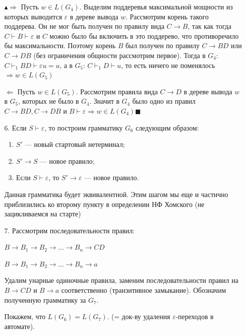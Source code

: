 \begin{itemize}
$\blacktriangle\Rightarrow$ Пусть $w \in L(G_4)$. Выделим поддеревья максимальной мощности из которых выводится $\varepsilon$ в дереве вывода $w$. Рассмотрим корень такого поддерева. Он не мог быть получен по правилу вида $C \rightarrow B$, так как тогда $C \vdash B \vdash \varepsilon$ и $C$ можно было бы включить в это поддерево, что противоречило бы максимальности. Поэтому корень $B$ был получен по правилу $C \rightarrow BD$ или $C \rightarrow DB$ (без ограничения общности рассмотрим первое). Тогда в $G_4$: $C \vdash_1 BD \vdash \varepsilon u = u$, а в $G_5$: $C \vdash_1 D \vdash u$, то есть ничего не поменялось $\Rightarrow w \in L(G_5)$

$\Leftarrow$ Пусть $w \in L(G_5)$. Рассмотрим правила вида $C \rightarrow D$ в дереве вывода $w$ в $G_5$, которых не было в $G_4$. Значит в $G_4$ было одно из правил $C \rightarrow BD, C\rightarrow DB$ и $B \vdash \varepsilon \Rightarrow w \in L(G_4) \blacksquare$

    \item[6.]Если $S \vdash \varepsilon$, то построим грамматику $G_6$ следующим образом:
\begin{enumerate}
    \item $S'$ — новый стартовый нетерминал;
    \item $S' \rightarrow S$ — новое правило;
    \item Если $S \vdash \varepsilon$, то $S' \rightarrow \varepsilon$ — новое правило.
\end{enumerate}

Данная грамматика будет эквивалентной. Этим шагом мы еще и частично приблизились ко второму пункту в определении НФ Хомского (не зацикливаемся на старте)

\item[7.] Рассмотрим последовательности правил:

\begin{center}
    $B \rightarrow B_1 \rightarrow B_2 \rightarrow \dots \rightarrow B_n \rightarrow CD$
    
    $B \rightarrow B_1 \rightarrow B_2 \rightarrow \dots \rightarrow B_n \rightarrow a$
\end{center}

Удалим унарные одиночные правила, заменим последовательности правил на $B \rightarrow CD$ и $B \rightarrow a$ соответственно (транзитивное замыкание). Обозначим полученную грамматику за $G_7$.

Покажем, что $L(G_6) = L(G_7)$. (= док-ву удаления $\varepsilon$-переходов в автомате).


\end{itemize}
